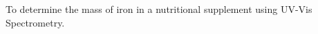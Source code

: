 \documentclass[main.tex]{subfiles}
\begin{document}
To determine the mass of iron in a nutritional supplement using UV-Vis Spectrometry.
\end{document}
